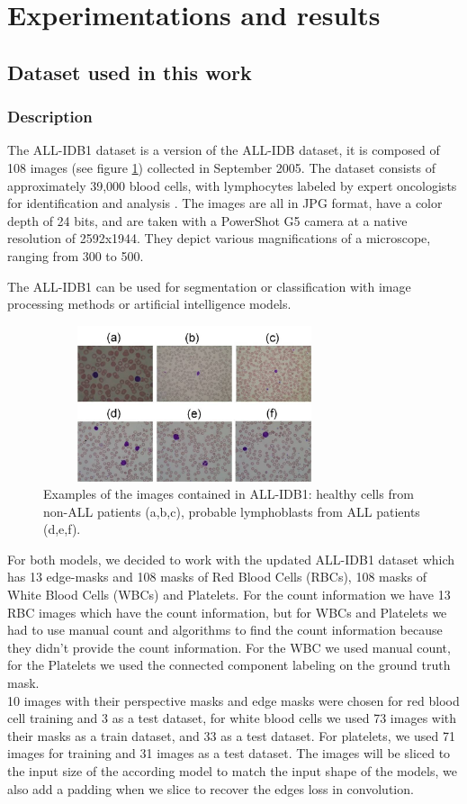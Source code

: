 \documentclass[conference]{IEEEtran}
\begin{document}
\vspace*{-0.3cm}
\section{Experimentations and results}
\subsection{Dataset used in this work}
\subsubsection{Description}
The ALL-IDB1 dataset is a version of the ALL-IDB dataset, it is composed of 108 images (see figure \ref{img1}) collected in September 2005. The dataset consists of approximately 39,000 blood cells, with lymphocytes labeled by expert oncologists for identification and analysis \cite{labati2011all}. The images are all in JPG format, have a color depth of 24 bits, and are taken with a PowerShot G5 camera at a native resolution of 2592x1944. They depict various magnifications of a microscope, ranging from 300 to 500.

The ALL-IDB1 can be used for segmentation or classification with image processing methods or artificial intelligence models.

\begin{figure}
\centering
\includegraphics[width=3.5in,height=1.8in]{../images/ALLIDB1.jpg}
\caption{Examples of the images contained in ALL-IDB1: healthy cells from non-ALL patients (a,b,c), probable lymphoblasts from ALL patients (d,e,f). }
\label{img1}
\vspace*{-0.5cm}
\end{figure}

For both models, we decided to work with the updated ALL-IDB1 dataset which has 13 edge-masks and 108 masks of Red Blood Cells (RBCs), 108 masks of White Blood Cells (WBCs) and Platelets. For the count information we have 13 RBC images which have the count information, but for WBCs and Platelets we had to use manual count and algorithms to find the count information because they didn't provide the count information. For the WBC we used manual count, for the Platelets we used the connected component labeling on the ground truth mask.\\
10 images with their perspective masks and edge masks were chosen for red blood cell training and 3 as a test dataset, for white blood cells we used 73 images with their masks as a train dataset, and 33 as a test dataset.
For platelets, we used 71 images for training and 31 images as a test dataset.
The images will be sliced to the input size of the according model to match the input shape of the models, we also add a padding when we slice to recover the edges loss in convolution.
\end{document}

